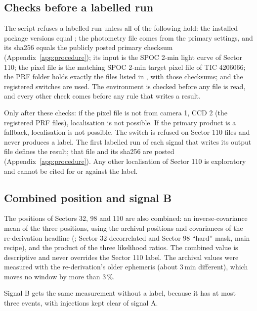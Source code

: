 \subsection{Checks before a labelled run}

The script refuses a labelled run unless all of the following hold: the installed package versions equal
; the photometry file comes from the primary settings, and its sha256 equals the publicly posted
primary checksum (Appendix~\ref{app:procedure}); its input is the SPOC 2-min light curve of Sector 110; the pixel file is
the matching SPOC 2-min target pixel file of TIC 4206066; the PRF folder holds exactly the files listed in
, with those checksums; and the registered switches are used. The environment is checked before
any file is read, and every other check comes before any rule that writes a result.

Only after these checks: if the pixel file is not from camera 1, CCD 2 (the registered PRF files), localisation is not
possible. If the primary product is a fallback, localisation is not possible. The switch  is refused on
Sector 110 files and never produces a label. The first labelled run of each signal that writes its output file defines
the result; that file and its sha256 are posted (Appendix~\ref{app:procedure}). Any other localisation of Sector 110 is
exploratory and cannot be cited for or against the label.

\subsection{Combined position and signal B}

The positions of Sectors 32, 98 and 110 are also combined: an inverse-covariance mean of the three positions, using the
archival positions and covariances of the re-derivation headline (; Sector 32
decorrelated and Sector 98 ``hard'' mask, main recipe), and the product of the three likelihood ratios. The combined
value is descriptive and never overrides the Sector 110 label. The archival values were measured with the
re-derivation's older ephemeris (about 3\,min different), which moves no window by more than 3\,\%.

Signal B gets the same measurement without a label, because it has at most three events, with injections kept clear
of signal A.

